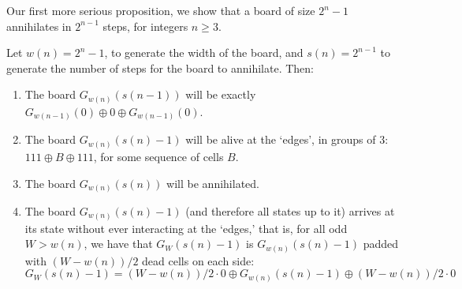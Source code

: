 \documentclass[12pt,letterpaper]{article}
\begin{document}
\noindent Our first more serious proposition, we show that a board of size $2^n-1$ annihilates in $2^{n-1}$ steps, for integers $n\geq 3$.
\begin{prop} \label{Power2} %
  Let $w(n)=2^n-1$, to generate the width of the board, and $s(n)=2^{n-1}$ to generate the number of steps for the board to annihilate. Then:\\
  \vspace*{-1.3em}
  \begin{enumerate}[label=(\alph*)]
    \item\label{a} The board $G_{w(n)}(s(n-1))$ will be exactly $G_{w(n-1)}(0)\oplus 0\oplus G_{w(n-1)}(0)$.
    \item\label{b} The board $G_{w(n)}(s(n)-1)$ will be alive at the `edges', in groups of 3: $111\oplus B\oplus 111$, for some sequence of cells $B$. 
    \item\label{c} The board $G_{w(n)}(s(n))$ will be annihilated.
    \item\label{d} The board $G_{w(n)}(s(n)-1)$ (and therefore all states up to it) arrives at its state without ever interacting at the `edges,' that is, for all odd $W>w(n)$, we have that $G_{W}(s(n)-1)$ is $G_{w(n)}(s(n)-1)$ padded with $(W-w(n))/2$ dead cells on each side: $$G_{W}(s(n)-1) = (W-w(n))/2\cdot 0 \oplus G_{w(n)}(s(n)-1) \oplus (W-w(n))/2\cdot 0$$
  \end{enumerate}
\end{prop}
\end{document}
